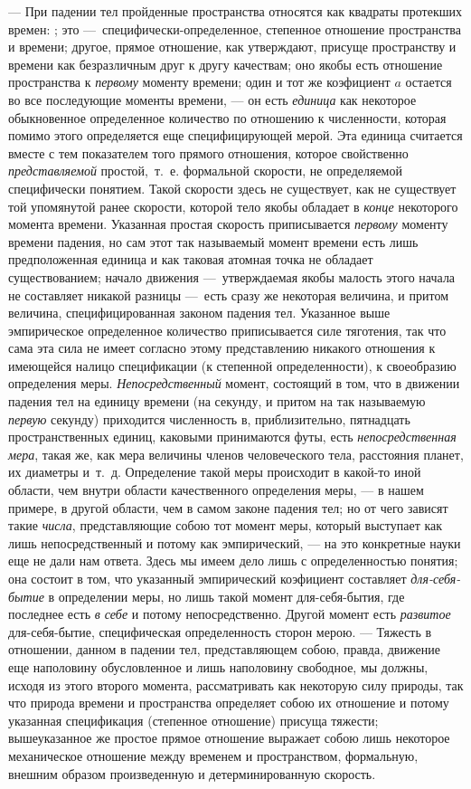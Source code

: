 — При падении тел пройденные пространства относятся как квадраты протекших
времен: ; это —~специфически-определенное, степенное отношение пространства
и времени; другое, прямое отношение, как утверждают, присуще пространству и
времени как безразличным друг к другу качествам; оно якобы есть отношение
пространства к {\em первому} моменту времени; один и
тот же коэфициент $a$ остается во все последующие
моменты времени, — он есть {\em единица} как некоторое
обыкновенное определенное количество по отношению к численности, которая
помимо этого определяется еще специфицирующей мерой. Эта единица считается
вместе с тем показателем того прямого отношения, которое свойственно
{\em представляемой} простой,~т.~е. формальной
скорости, не определяемой специфически понятием. Такой скорости здесь не
существует, как не существует той упомянутой ранее скорости, которой тело
якобы обладает в {\em конце} некоторого момента
времени. Указанная простая скорость приписывается
{\em первому} моменту времени падения, но сам этот так
называемый момент времени есть лишь предположенная единица и как таковая
атомная точка не обладает существованием; начало движения —~утверждаемая
якобы малость этого начала не составляет никакой разницы —~есть сразу же
некоторая величина, и притом величина, специфицированная законом падения
тел. Указанное выше эмпирическое определенное количество приписывается силе
тяготения, так что сама эта сила не имеет согласно этому представлению
никакого отношения к имеющейся налицо спецификации (к степенной
определенности), к своеобразию определения меры.
{\em Непосредственный} момент, состоящий в том, что в
движении падения тел на единицу времени (на секунду, и притом на так
называемую {\em первую} секунду) приходится численность
в, приблизительно, пятнадцать пространственных единиц, каковыми принимаются
футы, есть {\em непосредственная мера}, такая же, как
мера величины членов человеческого тела, расстояния планет, их диаметры
и~т.~д. Определение такой меры происходит в какой-то иной области, чем
внутри области качественного определения меры, — в нашем примере, в другой
области, чем в самом законе падения тел; но от чего зависят такие
{\em числа}, представляющие собою тот момент меры,
который выступает как лишь непосредственный и потому как эмпирический, — на
это конкретные науки еще не дали нам ответа. Здесь мы имеем дело лишь с
определенностью понятия; она состоит в том, что указанный эмпирический
коэфициент составляет {\em для-себя-бытие} в
определении меры, но лишь такой момент для-себя-бытия, где последнее есть
{\em в себе} и потому непосредственно. Другой момент
есть {\em развитое} для-себя-бытие, специфическая
определенность сторон мерою. — Тяжесть в отношении, данном в падении тел,
представляющем собою, правда, движение еще наполовину обусловленное и лишь
наполовину свободное, мы должны, исходя из этого второго момента,
рассматривать как некоторую силу природы, так что природа времени и
пространства определяет собою их отношение и потому указанная спецификация
(степенное отношение) присуща тяжести; вышеуказанное же простое прямое
отношение выражает собою лишь некоторое механическое отношение между
временем и пространством, формальную, внешним образом произведенную и
детерминированную скорость.

